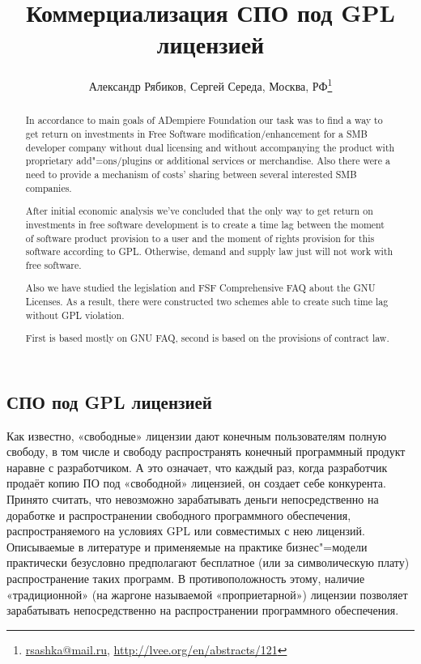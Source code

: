 \documentclass[10pt, a5paper]{article}
\begin{document}
\title{Коммерциализация СПО под GPL лицензией}
\author{Александр Рябиков, Сергей Середа, Москва, РФ\footnote{\url{rsashka@mail.ru}, \url{http://lvee.org/en/abstracts/121}}}
\maketitle
\begin{abstract}
In accordance to main goals of ADempiere Foundation our task was to find a way to get return on investments in Free Software modification/enhancement for a SMB developer company without dual licensing and without accompanying the pro\-duct with proprietary add"=ons/plugins or additional services or merchandise. Also there were a need to provide a mechanism of costs' sharing between several interested SMB companies.

After initial economic analysis we've concluded that the only way to get return on investments in free software development is to create a time lag between the moment of software product provision to a user and the moment of rights provision for this software according to GPL. Otherwise, demand and supply law just will not work with free software.

Also we have studied the legislation and FSF Comprehensive FAQ about the GNU Licenses. As a result, there were constructed two schemes able to create such time lag without GPL violation. 

First is based mostly on GNU FAQ, second is based on the provisions of contract law.
\end{abstract}


\subsection*{СПО под GPL лицензией}

Как известно, «свободные» лицензии дают конечным пользователям полную свободу, в том числе и свободу распространять конечный программный продукт наравне с разработчиком. А это означает, что каждый раз, когда разработчик продаёт копию ПО под «свободной» лицензией, он создает себе конкурента. Принято считать, что невозможно зарабатывать деньги непосредственно на доработке и распространении свободного программного обеспечения, распространяемого на условиях GPL или совместимых с нею лицензий. Описываемые в литературе и применяемые на практике бизнес"=модели практически безусловно предполагают бесплатное (или за символическую плату) распространение таких программ. В противоположность этому, наличие «традиционной» (на жаргоне называемой «проприетарной») лицензии позволяет зарабатывать непосредственно на распространении программного обеспечения.
\end{document}

